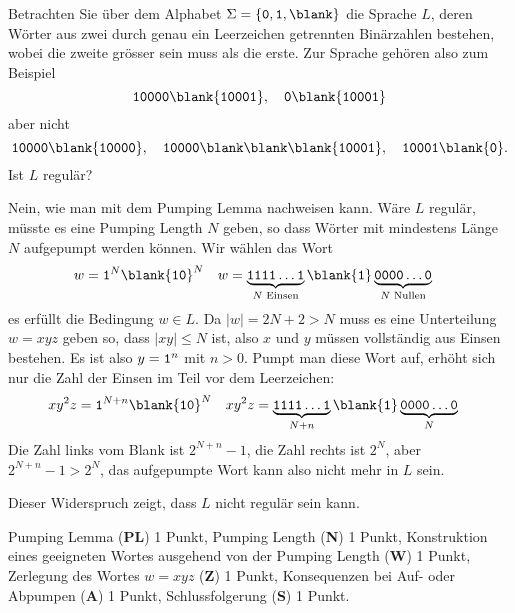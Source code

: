 Betrachten Sie über dem Alphabet $\Sigma = \{{\tt 0},{\tt 1},\blank\}$ die
Sprache $L$, deren Wörter aus zwei durch genau ein Leerzeichen getrennten
Binärzahlen bestehen, wobei die zweite grösser sein muss als die erste.
Zur Sprache gehören also zum Beispiel
\[
{\tt 10000}\blank{\tt 10001},\quad
{\tt 0}\blank{\tt 10001}
\]
aber nicht
\[
{\tt 10000}\blank{\tt 10000},\quad
{\tt 10000}\blank\blank\blank{\tt 10001},\quad
{\tt 10001}\blank{\tt 0}.
\]
Ist $L$ regulär?

\begin{loesung}
Nein, wie man mit dem Pumping Lemma nachweisen kann.
Wäre $L$ regulär, müsste es eine Pumping Length $N$ geben, so dass
Wörter mit mindestens Länge $N$ aufgepumpt werden können. Wir wählen
das Wort
\begin{align*}
w&= {\tt 1}^N\blank{\tt 10}^N
&
w&=\underbrace{\tt 1111\dots 1}_{\text{$N$ Einsen}}\blank{\tt 1}\underbrace{\tt 0000\dots 0}_{\text{$N$ Nullen}}
\end{align*}
es erfüllt die Bedingung $w\in L$. Da $|w| = 2N+2>N$ muss es eine
Unterteilung $w=xyz$ geben so, dass $|xy|\le N$ ist, also $x$ und $y$
müssen vollständig aus Einsen bestehen. Es ist also $y={\tt 1}^n$
mit $n > 0$.
Pumpt man diese Wort auf, erhöht sich nur die Zahl der Einsen im Teil
vor dem Leerzeichen:
\begin{align*}
xy^2z&={\tt 1}^{N+n}\blank{\tt 10}^N
&
xy^2z&=
\underbrace{\tt 1111\dots 1}_{N+n}\blank{\tt 1}\underbrace{\tt 0000\dots 0}_{N}
\end{align*}
Die Zahl links vom Blank ist $2^{N+n}-1$, die Zahl rechts ist $2^N$,
aber $2^{N+n}-1 > 2^N$, das aufgepumpte Wort kann also nicht mehr
in $L$ sein.

Dieser Widerspruch zeigt, dass $L$ nicht regulär sein kann.
\end{loesung}

\begin{bewertung}
Pumping Lemma ({\bf PL}) 1 Punkt,
Pumping Length ({\bf N}) 1 Punkt,
Konstruktion eines geeigneten Wortes ausgehend von der Pumping Length
({\bf W}) 1 Punkt,
Zerlegung des Wortes $w=xyz$ ({\bf Z}) 1 Punkt,
Konsequenzen bei Auf- oder Abpumpen ({\bf A}) 1 Punkt,
Schlussfolgerung ({\bf S}) 1 Punkt.
\end{bewertung}

